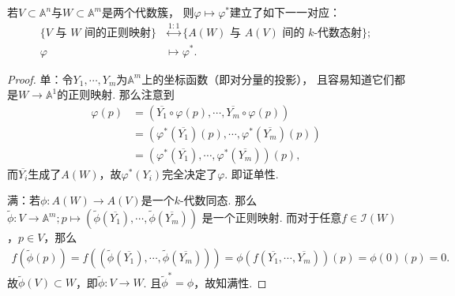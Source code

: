     \begin{theorem}
        若$V \subset \mathbb{A}^{n}$与$W \subset \mathbb{A}^{m}$是两个代数簇，
        则$\varphi \mapsto \varphi^{*}$建立了如下一一对应：
        \begin{equation*}\begin{aligned}
            \{V\text{ 与 }W\text{ 间的正则映射}\} 
            &\overset{1:1}{\longleftrightarrow} \{A(W)\text{ 与 }A(V)\text{ 间的 }k\text{-代数态射}\}; \\
            \varphi &\mapsto \varphi^{*}.
        \end{aligned}\end{equation*}
    \end{theorem}
    \begin{proof}
        单：令$Y_{1},\cdots,Y_{m}$为$\mathbb{A}^{m}$上的坐标函数（即对分量的投影），
        且容易知道它们都是$W \rightarrow \mathbb{A}^{1}$的正则映射. 那么注意到
        \begin{equation*}\begin{aligned}
            \varphi(p)
            &=(\overline{Y_{1}}\circ\varphi(p),\cdots,\overline{Y_{m}}\circ\varphi(p)) \\
            &=(\varphi^{*}(\overline{Y_{1}})(p),\cdots,\varphi^{*}(\overline{Y_{m}})(p)) \\
            &=(\varphi^{*}(\overline{Y_{1}}),\cdots,\varphi^{*}(\overline{Y_{m}}))(p),
        \end{aligned}\end{equation*}
        而$\overline{Y_{i}}$生成了$A(W)$，故$\varphi^{*}(Y_{i})$完全决定了$\varphi$. 即证单性. 

        满：若$\phi\colon A(W) \rightarrow A(V)$是一个$k$-代数同态. 
        那么$\widetilde{\phi}\colon V \rightarrow \mathbb{A}^{m};
        p \mapsto (\widetilde{\phi}(\overline{Y_{1}}),\cdots,\widetilde{\phi}(\overline{Y_{m}}))$
        是一个正则映射. 而对于任意$f \in \mathcal{I}(W)$，$p \in V$，那么
        \begin{equation*}\begin{aligned}
            f(\widetilde{\phi}(p))
            =f((\widetilde{\phi}(\overline{Y_{1}}),\cdots,\widetilde{\phi}(\overline{Y_{m}})))
            =\phi(f(\overline{Y_{1}},\cdots,\overline{Y_{m}}))(p)=\phi(0)(p)=0.
        \end{aligned}\end{equation*}
        故$\widetilde{\phi}(V) \subset W$，即$\widetilde{\phi}\colon V \rightarrow W$. 
        且$\widetilde{\phi}^{*}=\phi$，故知满性.
    \end{proof}

